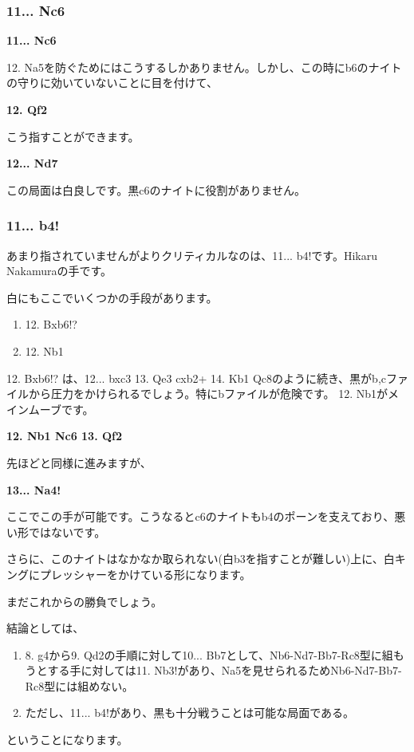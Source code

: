 \subsubsection{ 11... Nc6}

{\bf 11... Nc6}

12. Na5を防ぐためにはこうするしかありません。しかし、この時にb6のナイトの守りに効いていないことに目を付けて、

{\bf 12. Qf2}

こう指すことができます。

{\bf 12... Nd7}

この局面は白良しです。黒c6のナイトに役割がありません。

\subsubsection{11... b4!}

あまり指されていませんがよりクリティカルなのは、11... b4!です。Hikaru Nakamuraの手です。

白にもここでいくつかの手段があります。
\begin{enumerate}
\item 12. Bxb6!?
\item 12. Nb1
\end{enumerate}

12. Bxb6!? は、12... bxc3 13. Qe3 cxb2+ 14. Kb1 Qc8のように続き、黒がb,cファイルから圧力をかけられるでしょう。特にbファイルが危険です。
12. Nb1がメインムーブです。

{\bf 12. Nb1 Nc6 13. Qf2}

先ほどと同様に進みますが、

{\bf 13... Na4!}

ここでこの手が可能です。こうなるとc6のナイトもb4のポーンを支えており、悪い形ではないです。

さらに、このナイトはなかなか取られない(白b3を指すことが難しい)上に、白キングにプレッシャーをかけている形になります。

まだこれからの勝負でしょう。

結論としては、
\begin{enumerate}
\item 8. g4から9. Qd2の手順に対して10... Bb7として、Nb6-Nd7-Bb7-Rc8型に組もうとする手に対しては11. Nb3!があり、Na5を見せられるためNb6-Nd7-Bb7-Rc8型には組めない。
\item ただし、11... b4!があり、黒も十分戦うことは可能な局面である。
\end{enumerate}
ということになります。


